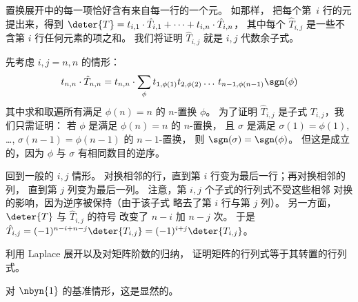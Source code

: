 \begin{exercises}
\begin{answer}
      置换展开中的每一项恰好含有来自每一行的一个元。
      如那样，
      把每个第~$i$ 行的元提出来，得到
      \( \deter{T}
           =t_{i,1}\cdot\hat{T}_{i,1}+\dots+t_{i,n}\cdot\hat{T}_{i,n} \)，
      其中每个 \( \hat{T}_{i,j} \) 是一些不含第 \( i \) 行任何元素的项之和。
      我们将证明 \( \hat{T}_{i,j} \) 就是 \( i,j \) 代数余子式。

      先考虑 \( i,j=n,n \) 的情形：
      \begin{equation*}
        t_{n,n}\cdot\hat{T}_{n,n}
        =t_{n,n}\cdot
            \sum_{\phi}t_{1,\phi(1)}t_{2,\phi(2)}\dots\,t_{n-1,\phi(n-1)}
                      \sgn(\phi)
      \end{equation*}
      其中求和取遍所有满足
      \( \phi(n)=n \) 的 \( n \)-置换 \( \phi \)。
      为了证明
      \( \hat{T}_{i,j} \) 是子式 \( T_{i,j} \)，我们只需证明：
      若 \( \phi \) 是满足 
      \( \phi(n)=n \) 的 \( n \)-置换，
      且 \( \sigma \) 是满足
      \( \sigma(1)=\phi(1) \), \ldots, \( \sigma(n-1)=\phi(n-1) \)
      的 \( n-1 \)-置换，
      则 \( \sgn(\sigma)=\sgn(\phi) \)。
      但这是成立的，因为 $\phi$ 与 $\sigma$ 
      有相同数目的逆序。

      回到一般的 \( i,j \) 情形。
      对换相邻的行，直到第 \( i \) 行变为最后一行；再对换相邻的列，
      直到第 \( j \) 列变为最后一列。
      注意，第 \( i,j \) 个子式的行列式不受这些相邻
      对换的影响，因为逆序被保持（由于该子式
      略去了第 \( i \) 行与第 \( j \) 列）。
      另一方面，\( \deter{T} \) 与 \( \hat{T}_{i,j} \) 的符号
      改变了 \( n-i \) 加 \( n-j \) 次。
      于是 \( \hat{T}_{i,j}=(-1)^{n-i+n-j}\deter{T_{i,j}}
                =(-1)^{i+j}\deter{T_{i,j}} \)。  
    \end{answer}
  \item 
    利用 Laplace 展开以及对矩阵阶数的归纳，
    证明矩阵的行列式等于其转置的行列式。
    \begin{answer}
      对 \( \nbyn{1} \) 的基准情形，这是显然的。


\end{answer}
\end{exercises}
